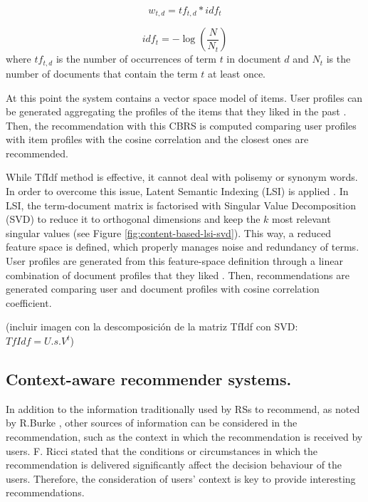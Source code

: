 \documentclass[preprint]{elsarticle}
\begin{document}
\begin{spacing}{1.5}
\begin{equation}
	w_{t,d} = tf_{t,d}*idf_{t}
	\label{eq:document-profile-tfidf-term-weights}
\end{equation}

\begin{equation}
	idf_t = -\log \left( \frac{N}{N_t}\right)
	\label{eq:document-profile-tfidf-idf}
\end{equation}
\noindent where $tf_{t,d}$ is the number of occurrences of term $t$ in document $d$ and $N_t$ is the number of documents that contain the term $t$ at least once.

At this point the system contains a vector space model of items. User profiles can be generated aggregating the profiles of the items that they liked in the past \cite{Symeonidis2007}. Then, the recommendation with this CBRS is computed comparing user profiles with item profiles with the cosine correlation and the closest ones are recommended. 

While TfIdf method is effective, it cannot deal with polisemy or synonym words. In order to overcome this issue, Latent Semantic Indexing (LSI) is applied \cite{deGemmis2015}. In LSI, the term-document matrix is factorised with Singular Value Decomposition (SVD) to reduce it to orthogonal dimensions and keep the $k$ most relevant singular values (see Figure \ref{fig:content-based-lsi-svd}). This way, a reduced feature space is defined, which properly manages noise and redundancy of terms. User profiles are generated from this feature-space definition through a linear combination of document profiles that they liked \cite{Bambini2011}. Then, recommendations are generated comparing user and document profiles with cosine correlation coefficient.

(incluir imagen con la descomposición de la matriz TfIdf con SVD: $TfIdf=U.s.V^t$)

\subsection{Context-aware recommender systems.}

In addition to the information traditionally used by RSs to recommend, as noted by R.Burke \cite{Burke2002}, other sources of information can be considered in the recommendation, such as the context in which the recommendation is received by users. F. Ricci \cite{Ricci2012contextualizing} stated that the conditions or circumstances in which the recommendation is delivered significantly affect the decision behaviour of the users. Therefore, the consideration of users' context is key to provide interesting recommendations.


\end{spacing}
\end{document}
